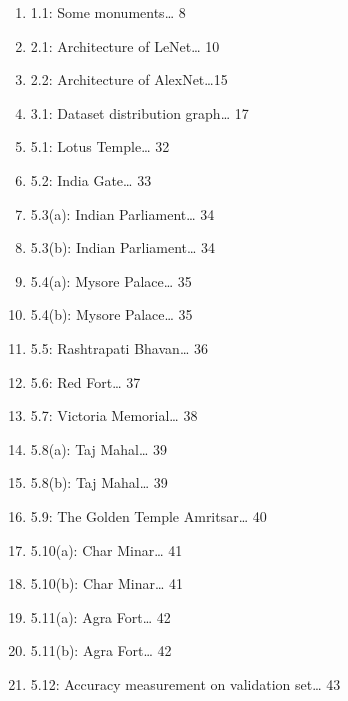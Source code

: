 \documentclass[10pt]{article} %
\begin{document}
\begin{enumerate}
\item \textbf{ }1.1: Some monuments{\dots} 8

\item  2.1: Architecture of LeNet{\dots} 10

\item  2.2: Architecture of AlexNet{\dots}15 

\item  3.1: Dataset distribution graph{\dots} 17

\item  5.1: Lotus Temple{\dots} 32

\item  5.2: India Gate{\dots} 33

\item  5.3(a): Indian Parliament{\dots} 34

\item  5.3(b): Indian Parliament{\dots} 34

\item  5.4(a): Mysore Palace{\dots} 35

\item  5.4(b): Mysore Palace{\dots} 35

\item  5.5: Rashtrapati Bhavan{\dots} 36

\item  5.6: Red Fort{\dots} 37

\item  5.7: Victoria Memorial{\dots} 38

\item  5.8(a): Taj Mahal{\dots} 39

\item  5.8(b): Taj Mahal{\dots} 39

\item  5.9: The Golden Temple Amritsar{\dots} 40

\item  5.10(a): Char Minar{\dots} 41

\item  5.10(b): Char Minar{\dots} 41

\item  5.11(a): Agra Fort{\dots} 42

\item  5.11(b): Agra Fort{\dots} 42

\item  5.12: Accuracy measurement on validation set{\dots} 43
\end{enumerate}
\end{document}
